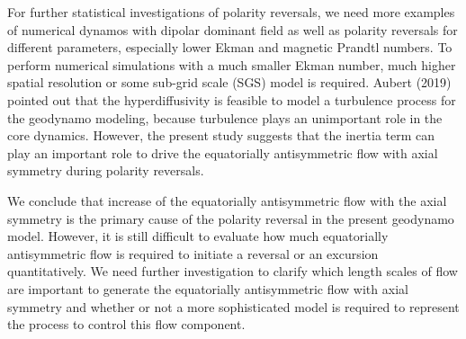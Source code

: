 {\color{teal}
For further statistical investigations of polarity reversals, we need more examples of numerical dynamos with dipolar dominant field as well as polarity reversals for different parameters, especially lower Ekman and magnetic Prandtl numbers.
}
To perform numerical simulations with a much smaller Ekman number, much higher spatial resolution or some sub-grid scale (SGS) model is required. 
Aubert (2019) pointed out that the hyperdiffusivity is feasible to model a turbulence process for the geodynamo modeling, %
{\color{teal}
because turbulence plays an unimportant role in the core dynamics.
}
However, the present study suggests that the inertia term can play an important role to drive the equatorially antisymmetric flow with axial symmetry during polarity reversals.
%

{\color{teal}
We conclude that increase of the equatorially antisymmetric flow with the axial symmetry is the primary cause of the polarity reversal in the present geodynamo model. 
However, it is still difficult to evaluate how much equatorially antisymmetric flow is required to initiate a reversal or an excursion quantitatively.
We need further investigation to clarify which length scales of flow are important to generate the equatorially antisymmetric flow with axial symmetry and whether or not a more sophisticated model is required to represent the process to control this flow component.
}

%
